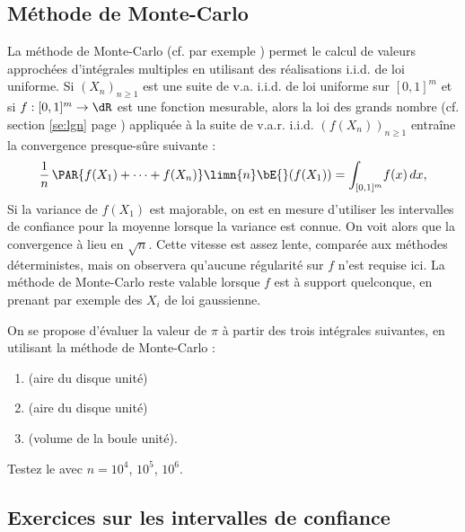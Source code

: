 %
\subsection{Méthode de Monte-Carlo}\label{ss:mc}
%

La méthode de Monte-Carlo (cf. par exemple \cite[p. 103]{dacunha-castelle-duflo})
permet le calcul de valeurs approchées d'intégrales multiples en utilisant des
réalisations i.i.d. de loi uniforme. Si $(X_n)_{n\geq 1}$ est une suite de
v.a. i.i.d. de loi uniforme sur $[0,1]^m$ et si $f:[0,1]^m\to\dR$ est une
fonction mesurable, alors la loi des grands nombre (cf. section \ref{se:lgn}
page \pageref{se:lgn}) appliquée à la suite de v.a.r. i.i.d. $(f(X_n))_{n\geq
  1}$ entraîne la convergence presque-sûre suivante :
$$
\frac{1}{n}\,\PAR{f(X_1)+\cdots+f(X_n)}
\limn{n}
\bE{}(f(X_1))=\int_{[0,1]^m}\! f(x)\,dx,
$$
Si la variance de $f(X_1)$ est majorable, on est en mesure d'utiliser les
intervalles de confiance pour la moyenne lorsque la variance est connue. On
voit alors que la convergence à lieu en $\sqrt{n}$. Cette vitesse est assez
lente, comparée aux méthodes déterministes, mais on observera qu'aucune
régularité sur $f$ n'est requise ici. La méthode de Monte-Carlo reste valable
lorsque $f$ est à support quelconque, en prenant par exemple des $X_i$ de loi
gaussienne.

\begin{xpl}
  On se propose d'évaluer la valeur de $\pi$ à partir des trois intégrales
  suivantes, en utilisant la méthode de Monte-Carlo :
\begin{enumerate}
\item {} \quad (aire du disque unité)
\item {} \quad (aire du disque unité)
\item {} \quad (volume de la boule
  unité).
\end{enumerate}
%
%
Testez le avec $n=10^4$, $10^5$, $10^6$.
%
%
%
\end{xpl}

\subsection{Exercices sur les intervalles de confiance}

